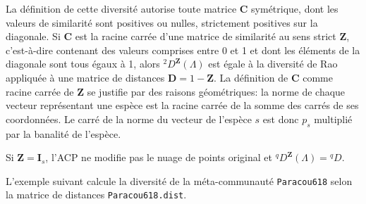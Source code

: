 \documentclass[
  11pt,
  french,
  a4paper,
  extrafontsizes,onecolumn,openright
  ]{memoir}
\newenvironment{Shaded}{\begin{snugshade}}{\end{snugshade}}
\newcommand{\CommentTok}[1]{\textcolor[rgb]{0.56,0.35,0.01}{\textit{#1}}}
\newcommand{\DecValTok}[1]{\textcolor[rgb]{0.00,0.00,0.81}{#1}}
\newcommand{\KeywordTok}[1]{\textcolor[rgb]{0.13,0.29,0.53}{\textbf{#1}}}
\newcommand{\NormalTok}[1]{#1}
\newcommand{\OperatorTok}[1]{\textcolor[rgb]{0.81,0.36,0.00}{\textbf{#1}}}
\newcommand{\StringTok}[1]{\textcolor[rgb]{0.31,0.60,0.02}{#1}}
\begin{document}
La définition de cette diversité autorise toute matrice \(\mathbf{C}\) symétrique, dont les valeurs de similarité sont positives ou nulles, strictement positives sur la diagonale.
Si \(\mathbf{C}\) est la racine carrée d'une matrice de similarité au sens strict \(\mathbf{Z}\), c'est-à-dire contenant des valeurs comprises entre 0 et 1 et dont les éléments de la diagonale sont tous égaux à 1, alors \(^2\!D^{\mathbf{Z}}(\Lambda)\) est égale à la diversité de Rao appliquée à une matrice de distances \(\mathbf{D}=1-\mathbf{Z}\).
La définition de \(\mathbf{C}\) comme racine carrée de \(\mathbf{Z}\) se justifie par des raisons géométriques: la norme de chaque vecteur représentant une espèce est la racine carrée de la somme des carrés de ses coordonnées.
Le carré de la norme du vecteur de l'espèce \(s\) est donc \(p_s\) multiplié par la banalité de l'espèce.

Si \(\mathbf{Z}=\mathbf{I}_s\), l'ACP ne modifie pas le nuage de points original et \(^q\!D^{\mathbf{Z}}(\Lambda)={^{q}\!D}\).

L'exemple suivant calcule la diversité de la méta-communauté \texttt{Paracou618} selon la matrice de distances \texttt{Paracou618.dist}.

\scriptsize

\begin{Shaded}
\end{Shaded}
\end{document}
